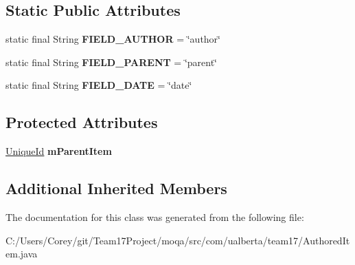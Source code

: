 \subsection*{Static Public Attributes}
\begin{DoxyCompactItemize}
\item 
\hypertarget{classcom_1_1ualberta_1_1team17_1_1_authored_item_a416ded7bdd97fb62c2ac55aa50e83249}{static final String {\bfseries F\+I\+E\+L\+D\+\_\+\+A\+U\+T\+H\+O\+R} = \char`\"{}author\char`\"{}}\label{classcom_1_1ualberta_1_1team17_1_1_authored_item_a416ded7bdd97fb62c2ac55aa50e83249}

\item 
\hypertarget{classcom_1_1ualberta_1_1team17_1_1_authored_item_aa2f08a89de77604037113e59524fafaa}{static final String {\bfseries F\+I\+E\+L\+D\+\_\+\+P\+A\+R\+E\+N\+T} = \char`\"{}parent\char`\"{}}\label{classcom_1_1ualberta_1_1team17_1_1_authored_item_aa2f08a89de77604037113e59524fafaa}

\item 
\hypertarget{classcom_1_1ualberta_1_1team17_1_1_authored_item_aaa04d4b600f062db35c07bedf613164d}{static final String {\bfseries F\+I\+E\+L\+D\+\_\+\+D\+A\+T\+E} = \char`\"{}date\char`\"{}}\label{classcom_1_1ualberta_1_1team17_1_1_authored_item_aaa04d4b600f062db35c07bedf613164d}

\end{DoxyCompactItemize}
\subsection*{Protected Attributes}
\begin{DoxyCompactItemize}
\item 
\hypertarget{classcom_1_1ualberta_1_1team17_1_1_authored_item_ae28119f6d411681cf00b2515cb762fc9}{\hyperlink{classcom_1_1ualberta_1_1team17_1_1_unique_id}{Unique\+Id} {\bfseries m\+Parent\+Item}}\label{classcom_1_1ualberta_1_1team17_1_1_authored_item_ae28119f6d411681cf00b2515cb762fc9}

\end{DoxyCompactItemize}
\subsection*{Additional Inherited Members}


The documentation for this class was generated from the following file\+:\begin{DoxyCompactItemize}
\item 
C\+:/\+Users/\+Corey/git/\+Team17\+Project/moqa/src/com/ualberta/team17/Authored\+Item.\+java\end{DoxyCompactItemize}
